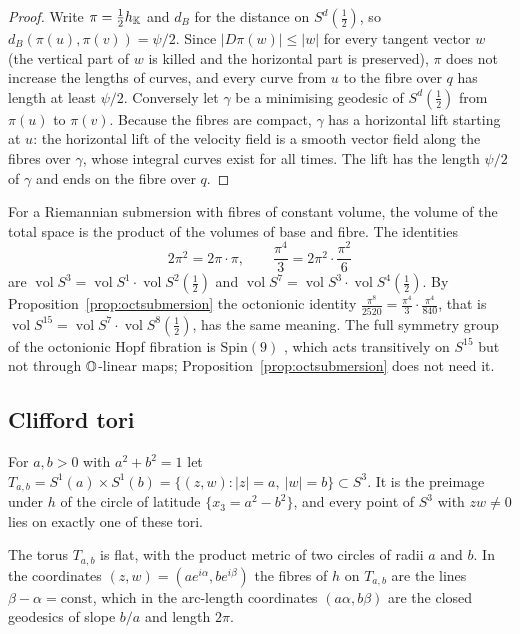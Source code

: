 \begin{proof}
Write $\pi=\tfrac12h_{\mathbb{K}}$ and $d_B$ for the distance on $S^d(\tfrac12)$, so $d_B(\pi(u),\pi(v))=\psi/2$. Since $|D\pi(w)|\le|w|$ for every tangent vector $w$ (the vertical part of $w$ is killed and the horizontal part is preserved), $\pi$ does not increase the lengths of curves, and every curve from $u$ to the fibre over $q$ has length at least $\psi/2$. Conversely let $\gamma$ be a minimising geodesic of $S^d(\tfrac12)$ from $\pi(u)$ to $\pi(v)$. Because the fibres are compact, $\gamma$ has a horizontal lift starting at $u$: the horizontal lift of the velocity field is a smooth vector field along the fibres over $\gamma$, whose integral curves exist for all times. The lift has the length $\psi/2$ of $\gamma$ and ends on the fibre over $q$.
\end{proof}

\begin{remark}[Volumes]
For a Riemannian submersion with fibres of constant volume, the volume of the total space is the product of the volumes of base and fibre. The identities
\[
2\pi^2=2\pi\cdot\pi,\qquad \frac{\pi^4}{3}=2\pi^2\cdot\frac{\pi^2}{6}
\]
are $\operatorname{vol}S^3=\operatorname{vol}S^1\cdot\operatorname{vol}S^2(\tfrac12)$ and $\operatorname{vol}S^7=\operatorname{vol}S^3\cdot\operatorname{vol}S^4(\tfrac12)$. By Proposition~\ref{prop:octsubmersion} the octonionic identity $\frac{\pi^8}{2520}=\frac{\pi^4}{3}\cdot\frac{\pi^4}{840}$, that is $\operatorname{vol}S^{15}=\operatorname{vol}S^7\cdot\operatorname{vol}S^8(\tfrac12)$, has the same meaning. The full symmetry group of the octonionic Hopf fibration is $\mathrm{Spin}(9)$ \cite{GWZ86}, which acts transitively on $S^{15}$ but not through $\mathbb{O}$-linear maps; Proposition~\ref{prop:octsubmersion} does not need it.
\end{remark}

\subsection{Clifford tori}\label{sec:clifford}

For $a,b>0$ with $a^2+b^2=1$ let $T_{a,b}=S^1(a)\times S^1(b)=\{(z,w):|z|=a,\ |w|=b\}\subset S^3$. It is the preimage under $h$ of the circle of latitude $\{x_3=a^2-b^2\}$, and every point of $S^3$ with $zw\neq0$ lies on exactly one of these tori.

\begin{proposition}\label{prop:clifford}
The torus $T_{a,b}$ is flat, with the product metric of two circles of radii $a$ and $b$. In the coordinates $(z,w)=(ae^{i\alpha},be^{i\beta})$ the fibres of $h$ on $T_{a,b}$ are the lines $\beta-\alpha=\mathrm{const}$, which in the arc-length coordinates $(a\alpha,b\beta)$ are the closed geodesics of slope $b/a$ and length $2\pi$.
\end{proposition}


